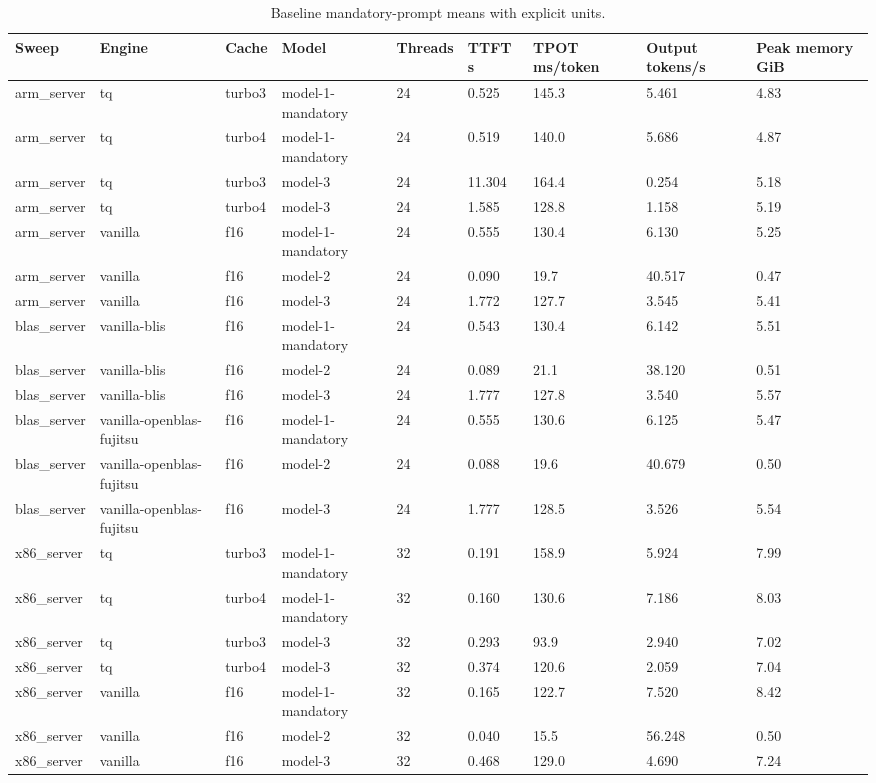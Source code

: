 \documentclass[11pt,a4paper]{article}
\begin{document}
\begin{table}[htbp]
\centering
\small
\begin{tabular}{lllllllll}
\hline
Sweep & Engine & Cache & Model & Threads & TTFT s & TPOT ms/token & Output tokens/s & Peak memory GiB \\
\hline
arm\_server & tq & turbo3 & model-1-mandatory & 24 & 0.525 & 145.3 & 5.461 & 4.83 \\
arm\_server & tq & turbo4 & model-1-mandatory & 24 & 0.519 & 140.0 & 5.686 & 4.87 \\
arm\_server & tq & turbo3 & model-3 & 24 & 11.304 & 164.4 & 0.254 & 5.18 \\
arm\_server & tq & turbo4 & model-3 & 24 & 1.585 & 128.8 & 1.158 & 5.19 \\
arm\_server & vanilla & f16 & model-1-mandatory & 24 & 0.555 & 130.4 & 6.130 & 5.25 \\
arm\_server & vanilla & f16 & model-2 & 24 & 0.090 & 19.7 & 40.517 & 0.47 \\
arm\_server & vanilla & f16 & model-3 & 24 & 1.772 & 127.7 & 3.545 & 5.41 \\
blas\_server & vanilla-blis & f16 & model-1-mandatory & 24 & 0.543 & 130.4 & 6.142 & 5.51 \\
blas\_server & vanilla-blis & f16 & model-2 & 24 & 0.089 & 21.1 & 38.120 & 0.51 \\
blas\_server & vanilla-blis & f16 & model-3 & 24 & 1.777 & 127.8 & 3.540 & 5.57 \\
blas\_server & vanilla-openblas-fujitsu & f16 & model-1-mandatory & 24 & 0.555 & 130.6 & 6.125 & 5.47 \\
blas\_server & vanilla-openblas-fujitsu & f16 & model-2 & 24 & 0.088 & 19.6 & 40.679 & 0.50 \\
blas\_server & vanilla-openblas-fujitsu & f16 & model-3 & 24 & 1.777 & 128.5 & 3.526 & 5.54 \\
x86\_server & tq & turbo3 & model-1-mandatory & 32 & 0.191 & 158.9 & 5.924 & 7.99 \\
x86\_server & tq & turbo4 & model-1-mandatory & 32 & 0.160 & 130.6 & 7.186 & 8.03 \\
x86\_server & tq & turbo3 & model-3 & 32 & 0.293 & 93.9 & 2.940 & 7.02 \\
x86\_server & tq & turbo4 & model-3 & 32 & 0.374 & 120.6 & 2.059 & 7.04 \\
x86\_server & vanilla & f16 & model-1-mandatory & 32 & 0.165 & 122.7 & 7.520 & 8.42 \\
x86\_server & vanilla & f16 & model-2 & 32 & 0.040 & 15.5 & 56.248 & 0.50 \\
x86\_server & vanilla & f16 & model-3 & 32 & 0.468 & 129.0 & 4.690 & 7.24 \\
\hline
\end{tabular}
\caption{Baseline mandatory-prompt means with explicit units.}
\label{tab:baseline}
\end{table}
\end{document}
